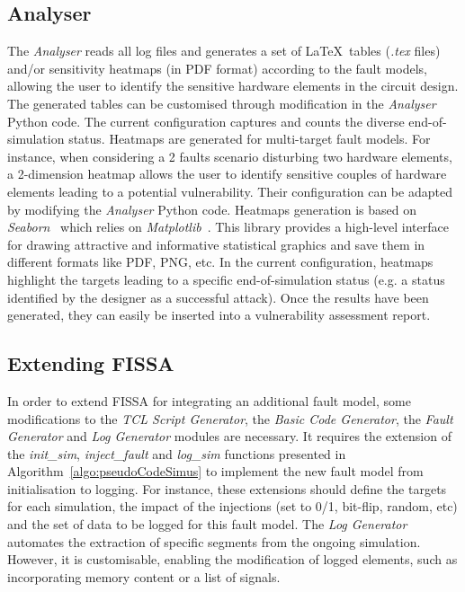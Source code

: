 \subsection{Analyser}
\label{subsec:analyser}

The \textit{Analyser} reads all log files and generates a set of \LaTeX~tables (\textit{.tex} files) and/or sensitivity heatmaps (in PDF format) according to the fault models, allowing the user to identify the sensitive hardware elements in the circuit design. 
The generated tables can be customised through modification in the \textit{Analyser} Python code.
The current configuration captures and counts the diverse end-of-simulation status.
Heatmaps are generated for multi-target fault models. For instance, when considering a 2 faults scenario disturbing two hardware elements, a 2-dimension heatmap allows the user to identify sensitive couples of hardware elements leading to a potential vulnerability.
Their configuration can be adapted by modifying the \textit{Analyser} Python code. Heatmaps generation is based on \textit{Seaborn}~\cite{seaborn} which relies on \textit{Matplotlib}~\cite{matplotlib}. This library provides a high-level interface for drawing attractive and informative statistical graphics and save them in different formats like PDF, PNG, etc.
In the current configuration, heatmaps highlight the targets leading to a specific end-of-simulation status (e.g. a status identified by the designer as a successful attack).
Once the results have been generated, they can easily be inserted into a vulnerability assessment report. 

\subsection{Extending FISSA}

In order to extend FISSA for integrating an additional fault model, some modifications to the \textit{TCL Script Generator}, the \textit{Basic Code Generator}, the \textit{Fault Generator} and \textit{Log Generator} modules are necessary. 
It requires the extension of the \textit{init\_sim}, \textit{inject\_fault} and \textit{log\_sim} functions presented in Algorithm~\ref{algo:pseudoCodeSimus} to implement the new fault model from initialisation to logging. 
For instance, these extensions should define the targets for each simulation, the impact of the injections (set to 0/1, bit-flip, random, etc) and the set of data to be logged for this fault model.
The \textit{Log Generator} automates the extraction of specific segments from the ongoing simulation. However, it is customisable, enabling the modification of logged elements, such as incorporating memory content or a list of signals.

